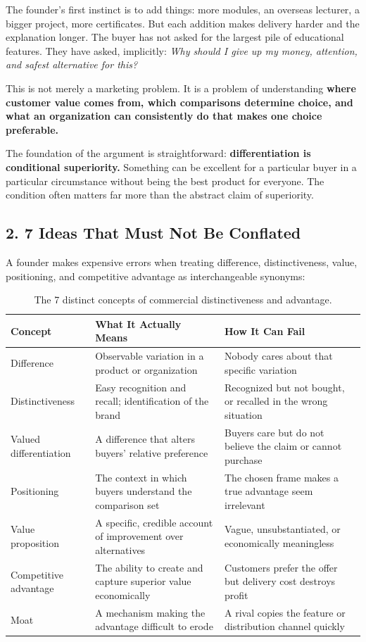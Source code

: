 The founder's first instinct is to add things: more modules, an overseas lecturer, a bigger project, more certificates. But each addition makes delivery harder and the explanation longer. The buyer has not asked for the largest pile of educational features. They have asked, implicitly: \emph{Why should I give up my money, attention, and safest alternative for this?}

This is not merely a marketing problem. It is a problem of understanding \textbf{where customer value comes from, which comparisons determine choice, and what an organization can consistently do that makes one choice preferable.}

The foundation of the argument is straightforward: \textbf{differentiation is conditional superiority.} Something can be excellent for a particular buyer in a particular circumstance without being the best product for everyone. The condition often matters far more than the abstract claim of superiority.

\subsection*{2. 7 Ideas That Must Not Be Conflated}

A founder makes expensive errors when treating difference, distinctiveness, value, positioning, and competitive advantage as interchangeable synonyms:

\begin{table}[t]
\centering
\small
\begin{tabularx}{\textwidth}{>{\raggedright\arraybackslash}p{3.2cm} >{\raggedright\arraybackslash}p{6.8cm} >{\raggedright\arraybackslash}X}
\toprule
\textbf{Concept} & \textbf{What It Actually Means} & \textbf{How It Can Fail} \\
\midrule
Difference & Observable variation in a product or organization & Nobody cares about that specific variation \\
Distinctiveness & Easy recognition and recall; identification of the brand & Recognized but not bought, or recalled in the wrong situation \\
Valued differentiation & A difference that alters buyers' relative preference & Buyers care but do not believe the claim or cannot purchase \\
Positioning & The context in which buyers understand the comparison set & The chosen frame makes a true advantage seem irrelevant \\
Value proposition & A specific, credible account of improvement over alternatives & Vague, unsubstantiated, or economically meaningless \\
Competitive advantage & The ability to create and capture superior value economically & Customers prefer the offer but delivery cost destroys profit \\
Moat & A mechanism making the advantage difficult to erode & A rival copies the feature or distribution channel quickly \\
\bottomrule
\end{tabularx}
\caption{The 7 distinct concepts of commercial distinctiveness and advantage.}
\label{tab:ch8-conflated-ideas}
\end{table}

